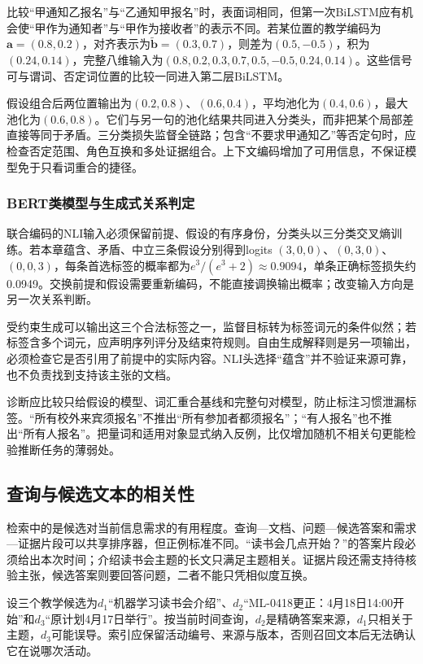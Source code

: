 比较“甲通知乙报名”与“乙通知甲报名”时，表面词相同，但第一次BiLSTM应有机会使“甲作为通知者”与“甲作为接收者”的表示不同。若某位置的教学编码为$\bm a=(0.8,0.2)$，对齐表示为$\widetilde{\bm b}=(0.3,0.7)$，则差为$(0.5,-0.5)$，积为$(0.24,0.14)$，完整八维输入为$(0.8,0.2,0.3,0.7,0.5,-0.5,0.24,0.14)$。这些信号可与谓词、否定词位置的比较一同进入第二层BiLSTM。

假设组合后两位置输出为$(0.2,0.8)$、$(0.6,0.4)$，平均池化为$(0.4,0.6)$，最大池化为$(0.6,0.8)$。它们与另一句的池化结果共同进入分类头，而非把某个局部差直接等同于矛盾。三分类损失监督全链路；包含“不要求甲通知乙”等否定句时，应检查否定范围、角色互换和多处证据组合。上下文编码增加了可用信息，不保证模型免于只看词重合的捷径。

\subsubsection{BERT类模型与生成式关系判定}
\label{sec:nlp-classification-nli-bert}

联合编码的NLI输入必须保留前提、假设的有序身份，分类头以三分类交叉熵训练。若本章蕴含、矛盾、中立三条假设分别得到logits $(3,0,0)$、$(0,3,0)$、$(0,0,3)$，每条首选标签的概率都为$e^3/(e^3+2)\approx0.9094$，单条正确标签损失约0.0949。交换前提和假设需要重新编码，不能直接调换输出概率；改变输入方向是另一次关系判断。

受约束生成可以输出这三个合法标签之一，监督目标转为标签词元的条件似然；若标签含多个词元，应声明序列评分及结束符规则。自由生成解释则是另一项输出，必须检查它是否引用了前提中的实际内容。NLI头选择“蕴含”并不验证来源可靠，也不负责找到支持该主张的文档。

诊断应比较只给假设的模型、词汇重合基线和完整句对模型，防止标注习惯泄漏标签。“所有校外来宾须报名”不推出“所有参加者都须报名”；“有人报名”也不推出“所有人报名”。把量词和适用对象显式纳入反例，比仅增加随机不相关句更能检验推断任务的薄弱处。

\subsection{查询与候选文本的相关性}
\label{sec:nlp-classification-relevance}

检索中的是候选对当前信息需求的有用程度。查询—文档、问题—候选答案和需求—证据片段可以共享排序器，但正例标准不同。“读书会几点开始？”的答案片段必须给出本次时间；介绍读书会主题的长文只满足主题相关。证据片段还需支持待核验主张，候选答案则要回答问题，二者不能只凭相似度互换。

设三个教学候选为$d_1$“机器学习读书会介绍”、$d_2$“ML-0418更正：4月18日14:00开始”和$d_3$“原计划4月17日举行”。按当前时间查询，$d_2$是精确答案来源，$d_1$只相关于主题，$d_3$可能误导。索引应保留活动编号、来源与版本，否则召回文本后无法确认它在说哪次活动。

